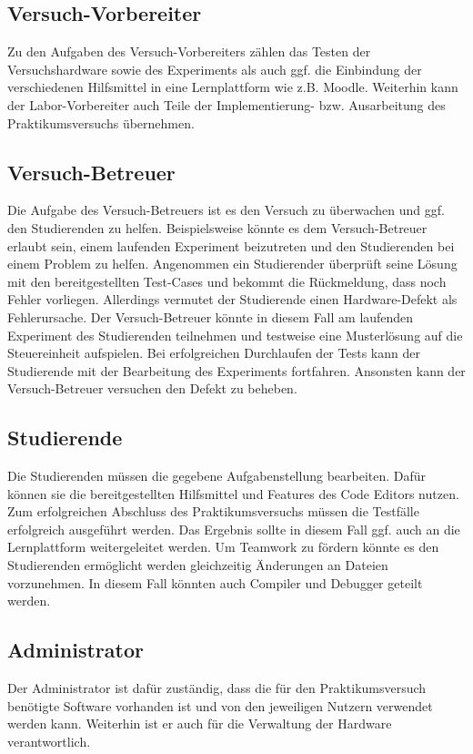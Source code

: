 \subsection{Versuch-Vorbereiter}

Zu den Aufgaben des Versuch-Vorbereiters zählen das Testen der Versuchshardware sowie des Experiments als auch ggf. die Einbindung der verschiedenen Hilfsmittel in eine Lernplattform wie z.B. Moodle. Weiterhin kann der Labor-Vorbereiter auch Teile der Implementierung- bzw. Ausarbeitung des Praktikumsversuchs übernehmen.

\subsection{Versuch-Betreuer}

Die Aufgabe des Versuch-Betreuers ist es den Versuch zu überwachen und ggf. den Studierenden zu helfen. Beispielsweise könnte es dem Versuch-Betreuer erlaubt sein, einem laufenden Experiment beizutreten und den Studierenden bei einem Problem zu helfen. Angenommen ein Studierender überprüft seine Lösung mit den bereitgestellten Test-Cases und bekommt die Rückmeldung, dass noch Fehler vorliegen. Allerdings vermutet der Studierende einen Hardware-Defekt als Fehlerursache. Der Versuch-Betreuer könnte in diesem Fall am laufenden Experiment des Studierenden teilnehmen und testweise eine Musterlösung auf die Steuereinheit aufspielen. Bei erfolgreichen Durchlaufen der Tests kann der Studierende mit der Bearbeitung des Experiments fortfahren. Ansonsten kann der Versuch-Betreuer versuchen den Defekt zu beheben.

\subsection{Studierende}

Die Studierenden müssen die gegebene Aufgabenstellung bearbeiten. Dafür können sie die bereitgestellten Hilfsmittel und Features des Code Editors nutzen. Zum erfolgreichen Abschluss des Praktikumsversuchs müssen die Testfälle erfolgreich ausgeführt werden. Das Ergebnis sollte in diesem Fall ggf. auch an die Lernplattform weitergeleitet werden. Um Teamwork zu fördern könnte es den Studierenden ermöglicht werden gleichzeitig Änderungen an Dateien vorzunehmen. In diesem Fall könnten auch Compiler und Debugger geteilt werden.

\subsection{Administrator}

Der Administrator ist dafür zuständig, dass die für den Praktikumsversuch benötigte Software vorhanden ist und von den jeweiligen Nutzern verwendet werden kann. Weiterhin ist er auch für die Verwaltung der Hardware verantwortlich.